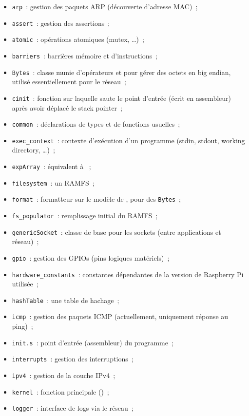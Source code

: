 \documentclass[11pt,a4paper]{article}
\newcommand{\fname}[1]{\texttt{#1}} %
\begin{document}
\begin{itemize}
	\item \fname{arp}~: gestion des paquets ARP (découverte d'adresse MAC)~;
	\item \fname{assert}~: gestion des assertions~;
	\item \fname{atomic}~: opérations atomiques (mutex, \ldots)~;
	\item \fname{barriers}~: barrières mémoire et d'instructions~;
	\item \fname{Bytes}~: classe munie d'opérateurs \lstc{<<} et \lstc{>>} pour gérer des
		octets en big endian, utilisé essentiellement pour le réseau~;
	\item \fname{cinit}~: fonction sur laquelle saute le point d'entrée
		(écrit en assembleur) après avoir déplacé le stack pointer~;
	\item \fname{common}~: déclarations de types et de fonctions usuelles~;
	\item \fname{exec\_context}~: contexte d'exécution d'un programme
		(stdin, stdout, working directory, \ldots)~;
	\item \fname{expArray}~: équivalent à ~;
	\item \fname{filesystem}~: un RAMFS~;
	\item \fname{format}~: formatteur sur le modèle de , pour des
		\fname{Bytes}~;
	\item \fname{fs\_populator}~: remplissage initial du RAMFS~;
	\item \fname{genericSocket}~: classe de base pour les sockets (entre
		applications et réseau)~;
	\item \fname{gpio}~: gestion des GPIOs (pins logiques matériels)~;
	\item \fname{hardware\_constants}~: constantes dépendantes de la version
		de Raspberry Pi utilisée~;
	\item \fname{hashTable}~: une table de hachage~;
	\item \fname{icmp}~: gestion des paquets ICMP (actuellement, uniquement
		réponse au ping)~;
	\item \fname{init.s}~: point d'entrée (assembleur) du programme~;
	\item \fname{interrupts}~: gestion des interruptions~;
	\item \fname{ipv4}~: gestion de la couche IPv4~;
	\item \fname{kernel}~: fonction principale ()~;
	\item \fname{logger}~: interface de logs via le réseau~;

\end{itemize}
\end{document}
